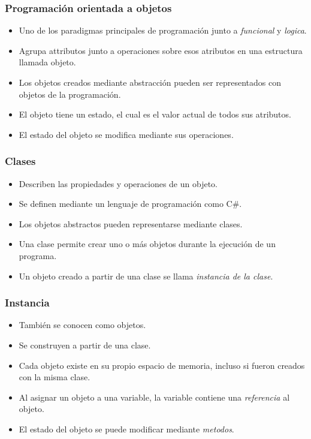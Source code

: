 \documentclass{beamer}
\begin{document}
\begin{frame}
\frametitle{Programaci\'on orientada a objetos}
\begin{itemize}
    \item Uno de los paradigmas principales de programaci\'on junto a \emph{funcional} y \emph{logica}.
    \item Agrupa attributos junto a operaciones sobre esos atributos en una estructura llamada objeto.
    \item Los objetos creados mediante abstracci\'on pueden ser representados con objetos de la programaci\'on.
    \item El objeto tiene un estado, el cual es el valor actual de todos sus atributos.
    \item El estado del objeto se modifica mediante sus operaciones.
\end{itemize}
\end{frame}

\begin{frame}
\frametitle{Clases}
\begin{itemize}
    \item Describen las propiedades y operaciones de un objeto.
    \item Se definen mediante un lenguaje de programaci\'on como C\#.
    \item Los objetos abstractos pueden representarse mediante clases.
    \item Una clase permite crear uno o m\'as objetos durante la ejecuci\'on de un programa.
    \item Un objeto creado a partir de una clase se llama \emph{instancia de la clase}.
\end{itemize}
\end{frame}

\begin{frame}
\frametitle{Instancia}
\begin{itemize}
    \item Tambi\'en se conocen como objetos.
    \item Se construyen a partir de una clase.
    \item Cada objeto existe en su propio espacio de memoria, incluso si fueron creados con la misma clase.
    \item Al asignar un objeto a una variable, la variable contiene una \emph{referencia} al objeto.
    \item El estado del objeto se puede modificar mediante \emph{metodos}.
\end{itemize}
\end{frame}
\end{document}
